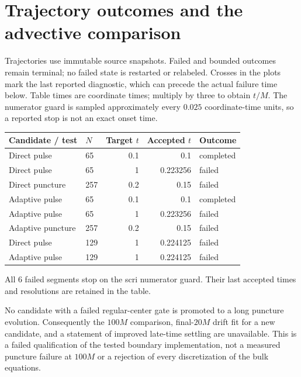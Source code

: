 \section{Trajectory outcomes and the advective comparison}

Trajectories use immutable source snapshots. Failed and bounded outcomes remain terminal; no failed state is restarted or relabeled. Crosses in the plots mark the last reported diagnostic, which can precede the actual failure time below. Table times are coordinate times; multiply by three to obtain $t/M$. The numerator guard is sampled approximately every $0.025$ coordinate-time units, so a reported stop is not an exact onset time.

\begin{center}\small\begin{tabular}{llrrl}\toprule

Candidate / test & $N$ & Target $t$ & Accepted $t$ & Outcome\\\midrule

Direct pulse & 65 & 0.1 & 0.1 & completed\\

Direct pulse & 65 & 1 & 0.223256 & failed\\

Direct puncture & 257 & 0.2 & 0.15 & failed\\

Adaptive pulse & 65 & 0.1 & 0.1 & completed\\

Adaptive pulse & 65 & 1 & 0.223256 & failed\\

Adaptive puncture & 257 & 0.2 & 0.15 & failed\\

Direct pulse & 129 & 1 & 0.224125 & failed\\

Adaptive pulse & 129 & 1 & 0.224125 & failed\\

\bottomrule\end{tabular}\end{center}

All 6 failed segments stop on the scri numerator guard. Their last accepted times and resolutions are retained in the table.

No candidate with a failed regular-center gate is promoted to a long puncture evolution. Consequently the $100M$ comparison, final-$20M$ drift fit for a new candidate, and a statement of improved late-time settling are unavailable. This is a failed qualification of the tested boundary implementation, not a measured puncture failure at $100M$ or a rejection of every discretization of the bulk equations.

